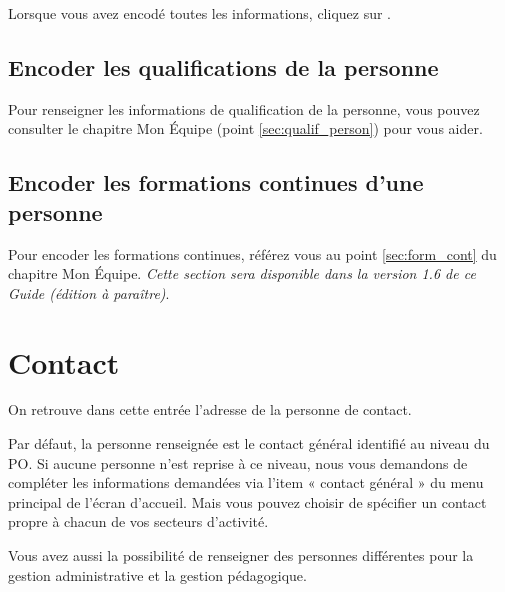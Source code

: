 \vspace{0.5cm}

Lorsque vous avez encodé toutes les informations, cliquez sur . 



%




\subsection{Encoder les qualifications de la personne}
\begin{conseil}
Pour renseigner les informations de qualification de la personne, vous pouvez consulter le chapitre Mon Équipe (point \ref{sec:qualif_person}) pour vous aider.
\end{conseil}



\subsection{Encoder les formations continues d’une personne }

\begin{conseil}
Pour encoder les formations continues, référez vous au point \ref{sec:form_cont} du chapitre Mon Équipe. \textit{Cette section sera disponible dans la version 1.6 de ce Guide (édition à paraître)}.
\end{conseil}

\section{Contact}
On retrouve dans cette entrée l’adresse de la personne de contact.

Par défaut, la personne renseignée est le contact général identifié au niveau du PO. Si aucune personne n’est reprise à ce niveau, nous vous demandons de compléter les informations demandées via l’item « contact général » du menu principal de l’écran d’accueil.
Mais vous pouvez choisir de spécifier un contact propre à chacun de vos secteurs d’activité. 

Vous avez aussi la possibilité de renseigner des personnes différentes pour la gestion administrative et la gestion pédagogique.

